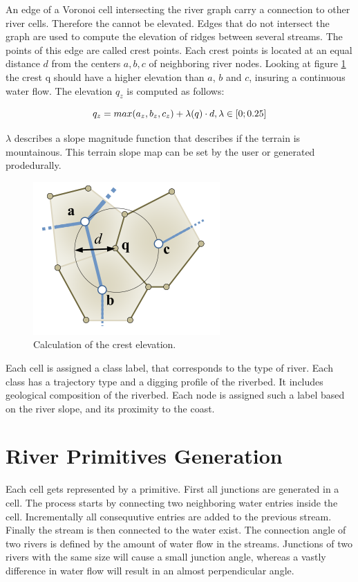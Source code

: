 An edge of a Voronoi cell intersecting the river graph carry a connection to other river cells. Therefore the cannot be elevated. Edges that do not intersect the graph are used to compute the elevation of ridges between several streams. The points of this edge are called crest points. Each crest points is located at an equal distance $d$ from the centers $a, b, c$ of neighboring river nodes. Looking at figure \ref{fig:crest} the crest q should have a higher elevation than $a$, $b$ and $c$, insuring a continuous water flow. The elevation $q_z$ is computed as follows: 

$$q_z = max(a_z, b_z, c_z) + \lambda(q) \cdot d, \\ \lambda \in [0; 0.25]$$ 

$\lambda$ describes a slope magnitude function that describes if the terrain is mountainous. This terrain slope map can be set by the user or generated prodedurally. 
\begin{figure}[htb]
	\centering
	\includegraphics[width=\linewidth]{GGG13/crest}
	\caption{Calculation of the crest elevation.}
	\label{fig:crest}
\end{figure}

Each cell is assigned a class label, that corresponds to the type of river. Each class has a trajectory type and a digging profile of the riverbed. It includes geological composition of the riverbed. Each node is assigned such a label based on the river slope, and its proximity to the coast. 

\section{River Primitives Generation}
Each cell gets represented by a primitive. First all junctions are generated in a cell. The process starts by connecting two neighboring water entries inside the cell. Incrementally all consequutive entries are added to the previous stream. Finally the stream is then connected to the water exist. The connection angle of two rivers is defined by the amount of water flow in the streams. Junctions of two rivers with the same size will cause a small junction angle, whereas a vastly difference in water flow will result in an almost perpendicular angle. 
